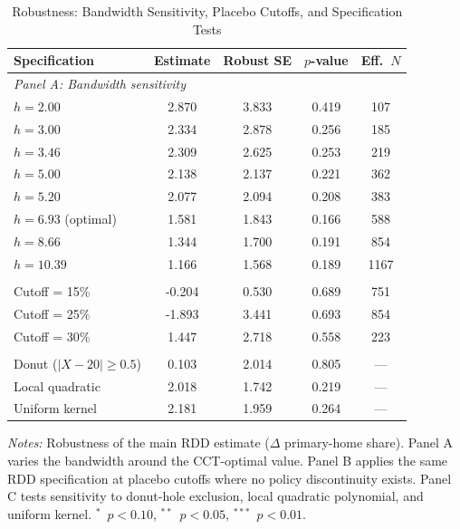 \begin{table}[htbp]
\centering
\caption{Robustness: Bandwidth Sensitivity, Placebo Cutoffs, and Specification Tests}
\label{tab:robustness}
\begin{tabular}{lcccc}
\toprule
Specification & Estimate & Robust SE & $p$-value & Eff.~$N$ \\
\midrule
\multicolumn{5}{l}{\textit{Panel A: Bandwidth sensitivity}} \\
\quad $h = 2.00$ & 2.870 & 3.833 & 0.419 & 107 \\
\quad $h = 3.00$ & 2.334 & 2.878 & 0.256 & 185 \\
\quad $h = 3.46$ & 2.309 & 2.625 & 0.253 & 219 \\
\quad $h = 5.00$ & 2.138 & 2.137 & 0.221 & 362 \\
\quad $h = 5.20$ & 2.077 & 2.094 & 0.208 & 383 \\
\quad $h = 6.93$ (optimal) & 1.581 & 1.843 & 0.166 & 588 \\
\quad $h = 8.66$ & 1.344 & 1.700 & 0.191 & 854 \\
\quad $h = 10.39$ & 1.166 & 1.568 & 0.189 & 1167 \\
\addlinespace
\multicolumn{5}{l}{\textit{Panel B: Placebo cutoffs}} \\
\quad Cutoff = 15\% & -0.204 & 0.530 & 0.689 & 751 \\
\quad Cutoff = 25\% & -1.893 & 3.441 & 0.693 & 854 \\
\quad Cutoff = 30\% & 1.447 & 2.718 & 0.558 & 223 \\
\addlinespace
\multicolumn{5}{l}{\textit{Panel C: Specification tests}} \\
\quad Donut ($|X - 20| \geq 0.5$) & 0.103 & 2.014 & 0.805 & --- \\
\quad Local quadratic & 2.018 & 1.742 & 0.219 & --- \\
\quad Uniform kernel & 2.181 & 1.959 & 0.264 & --- \\
\bottomrule
\end{tabular}
\begin{tablenotes}[flushleft]\footnotesize
\item \textit{Notes:} Robustness of the main RDD estimate ($\Delta$ primary-home share). Panel A varies the bandwidth around the CCT-optimal value. Panel B applies the same RDD specification at placebo cutoffs where no policy discontinuity exists. Panel C tests sensitivity to donut-hole exclusion, local quadratic polynomial, and uniform kernel. $^{*}$~$p<0.10$, $^{**}$~$p<0.05$, $^{***}$~$p<0.01$.
\end{tablenotes}
\end{table}
